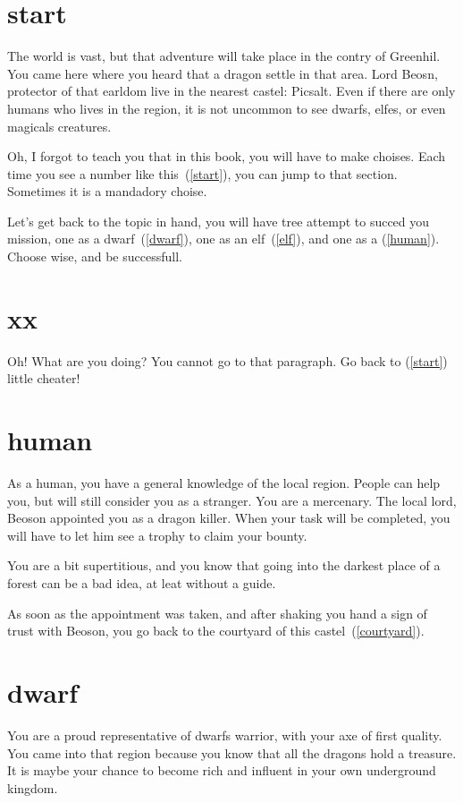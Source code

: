 \section{start}

The world is vast, but that adventure will take place in
the contry of Greenhil. You came here where you heard that a dragon settle in
that area. Lord Beosn, protector of that earldom live in the nearest castel:
Picsalt. Even if there are only humans who lives in the region, it is not
uncommon to see dwarfs, elfes, or even magicals creatures.

Oh, I forgot to teach you that in this book, you will have to make choises. Each
time you see a number like this~(\ref{start}), you can jump to that section.
Sometimes it is a mandadory choise.

Let's get back to the topic in hand, you will have tree attempt to succed you
mission, one as a dwarf~(\ref{dwarf}), one as an elf~(\ref{elf}), and one as a
(\ref{human}). Choose wise, and be successfull.

\section{xx}

Oh! What are you doing? You cannot go to that paragraph. Go back to
(\ref{start}) little cheater!

\section{human}

As a human, you have a general knowledge of the local region. People can help
you, but will still consider you as a stranger. You are a mercenary. The local
lord, Beoson appointed you as a dragon killer. When your task will be completed,
you will have to let him see a trophy to claim your bounty.

You are a bit supertitious, and you know that going into the darkest place
of a forest can be a bad idea, at leat without a guide.

As soon as the appointment was taken, and after shaking you hand a sign of trust
with Beoson, you go back to the courtyard of this castel~(\ref{courtyard}).

\section{dwarf}

You are a proud representative of dwarfs warrior, with your axe of first
quality. You came into that region because you know that all the dragons hold a
treasure. It is maybe your chance to become rich and influent in your own
underground kingdom.

